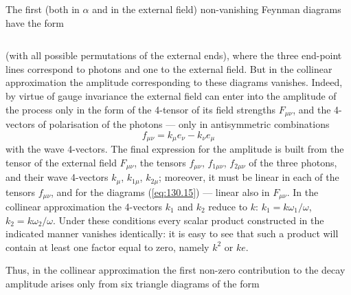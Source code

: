 The first (both in $\alpha$ and in the external field) non-vanishing Feynman diagrams have the form

\begin{equation}
\label{eq:130.15}
\end{equation}


\noindent (with all possible permutations of the external ends), where the three end-point lines correspond to photons and one to the external field. But in the collinear approximation the amplitude corresponding to these diagrams vanishes. Indeed, by virtue of gauge invariance the external field can enter into the amplitude of the process only in the form of the 4-tensor of its field strengths $F_{\mu\nu}$, and the 4-vectors of polarisation of the photons --- only in antisymmetric combinations
\[
f_{\mu\nu} = k_\mu e_\nu - k_\nu e_\mu
\]
with the wave 4-vectors. The final expression for the amplitude is built from the tensor of the external field $F_{\mu\nu}$, the tensors $f_{\mu\nu}$, $f_{1\mu\nu}$, $f_{2\mu\nu}$ of the three photons, and their wave 4-vectors $k_\mu$, $k_{1\mu}$, $k_{2\mu}$; moreover, it must be linear in each of the tensors $f_{\mu\nu}$, and for the diagrams (\ref{eq:130.15}) --- linear also in $F_{\mu\nu}$. In the collinear approximation the 4-vectors $k_1$ and $k_2$ reduce to $k$: $k_1 = k\omega_1/\omega$, $k_2 = k\omega_2/\omega$. Under these conditions every scalar product constructed in the indicated manner vanishes identically: it is easy to see that such a product will contain at least one factor equal to zero, namely $k^2$ or $ke$.

Thus, in the collinear approximation the first non-zero contribution to the decay amplitude arises only from six triangle diagrams of the form

\begin{equation}
\label{eq:130.16}
\end{equation}


